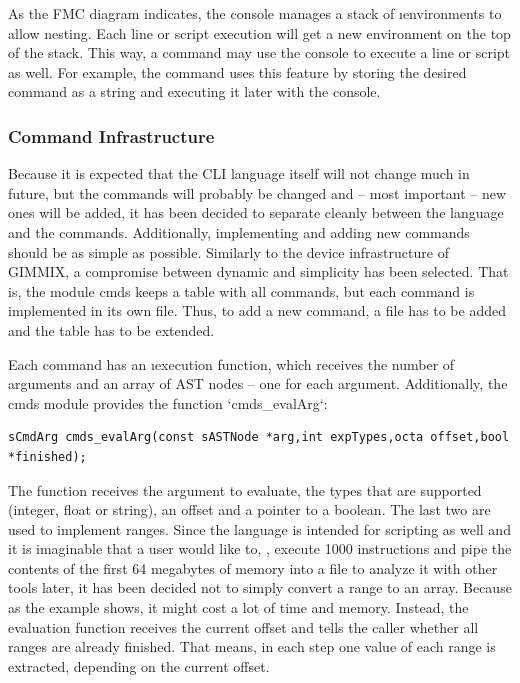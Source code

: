 As the FMC diagram indicates, the console manages a stack of \i{environments} to allow nesting. Each line or script execution will get a new environment on the top of the stack. This way, a command may use the console to execute a line or script as well. For example, the command  uses this feature by storing the desired command as a string and executing it later with the console.

\subsubsection{Command Infrastructure}

Because it is expected that the CLI language itself will not change much in future, but the commands will probably be changed and -- most important -- new ones will be added, it has been decided to separate cleanly between the language and the commands. Additionally, implementing and adding new commands should be as simple as possible. Similarly to the device infrastructure of GIMMIX, a compromise between dynamic and simplicity has been selected. That is, the module cmds keeps a table with all commands, but each command is implemented in its own file. Thus, to add a new command, a file has to be added and the table has to be extended.

Each command has an \i{execution function}, which receives the number of arguments and an array of \gls{AST} nodes -- one for each argument. Additionally, the cmds module provides the function `cmds_evalArg`:
\begin{lstlisting}[language=GIMMIXC]
sCmdArg cmds_evalArg(const sASTNode *arg,int expTypes,octa offset,bool *finished);
\end{lstlisting}
The function receives the argument to evaluate, the types that are supported (integer, float or string), an offset and a pointer to a boolean. The last two are used to implement ranges. Since the language is intended for scripting as well and it is imaginable that a user would like to, \eg, execute 1000 instructions and pipe the contents of the first 64 megabytes of memory into a file to analyze it with other tools later, it has been decided not to simply convert a range to an array. Because as the example shows, it might cost a lot of time and memory. Instead, the evaluation function receives the current offset and tells the caller whether all ranges are already finished. That means, in each step one value of each range is extracted, depending on the current offset.


